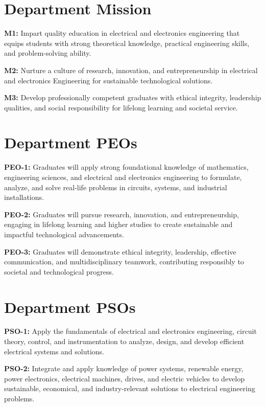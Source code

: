 \begin{titlepage}
	\section*{\centering Department Mission}
	
	\noindent \textbf{M1:} Impart quality education in electrical and electronics engineering that equips students with strong theoretical knowledge, practical engineering skills, and problem-solving ability.
	
	\noindent \textbf{M2:} Nurture a culture of research, innovation, and entrepreneurship in electrical and electronics Engineering for sustainable technological solutions.
	
	\noindent \textbf{M3:} Develop professionally competent graduates with ethical integrity, leadership qualities, and social responsibility for lifelong learning and societal service.
	
	\section*{\centering Department PEOs}
	
	\noindent \textbf{PEO-1:} Graduates will apply strong foundational knowledge of mathematics, engineering sciences, and electrical and electronics engineering to formulate, analyze, and solve real-life problems in circuits, systems, and industrial
	installations.
	
	\noindent \textbf{PEO-2:} Graduates will pursue research, innovation, and entrepreneurship, engaging in lifelong learning and higher studies to create sustainable and impactful technological advancements.
	
	\noindent \textbf{PEO-3:} Graduates will demonstrate ethical integrity, leadership, effective communication, and multidisciplinary teamwork, contributing responsibly to societal and technological progress.
	
	\section*{\centering Department PSOs}
	
	\noindent \textbf{PSO-1:} Apply the fundamentals of electrical and electronics engineering, circuit theory, control, and instrumentation to
	analyze, design, and develop efficient electrical systems and solutions.
	
	\noindent \textbf{PSO-2:} Integrate and apply knowledge of power systems, renewable energy, power electronics, electrical machines, drives, and electric vehicles to develop sustainable, economical, and industry-relevant solutions to electrical engineering
	problems.
	

\end{titlepage}
